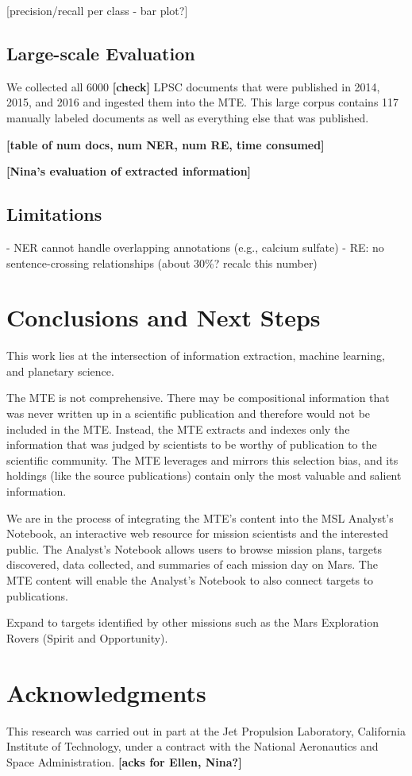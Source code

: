 \documentclass[letterpaper]{article} %
\begin{document}
[precision/recall per class - bar plot?]

\subsection{Large-scale Evaluation}

We collected all 6000 {\bf [check]} LPSC documents that were published
in 2014, 2015, and 2016 and ingested them into the MTE.  This large
corpus contains 117 manually labeled documents as well as everything
else that was published.

{\bf [table of num docs, num NER, num RE, time consumed]}

{\bf [Nina's evaluation of extracted information]}

\subsection{Limitations}
- NER cannot handle overlapping annotations (e.g., calcium sulfate)
- RE: no sentence-crossing relationships (about 30\%? recalc this number)

\section{Conclusions and Next Steps}

This work lies at the intersection of information extraction, machine
learning, and planetary science.  

The MTE is not comprehensive.  There may be compositional information
that was never written up in a scientific publication and therefore
would not be included in the MTE.  Instead, the MTE extracts and
indexes only the information that was judged by scientists to be
worthy of publication to the scientific community.  The MTE leverages
and mirrors this selection bias, and its holdings (like the source
publications) contain only the most valuable and salient information.

We are in the process of integrating the MTE's content into the MSL
Analyst's Notebook, an interactive web resource for mission scientists
and the interested public.  The Analyst's Notebook allows users to
browse mission plans, targets discovered, data collected, and
summaries of each mission day on Mars.  The MTE content will enable
the Analyst's Notebook to also connect targets to publications.

Expand to targets identified by other missions such as the Mars
Exploration Rovers (Spirit and Opportunity).

\section{Acknowledgments}
This research was carried out in part at the Jet Propulsion Laboratory,
California Institute of Technology, under a contract with the National
Aeronautics and Space Administration.  {\bf [acks for Ellen, Nina?]}



\end{document}

